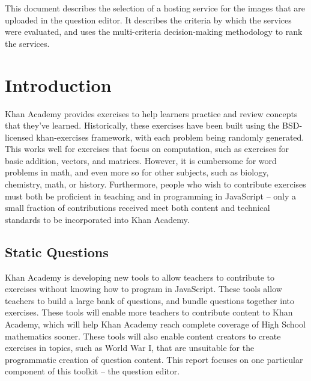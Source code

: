 \documentclass[se]{uw-wkrpt}
\begin{document}
This document describes the selection of a hosting service for the images that 
are uploaded in the question editor. It describes the criteria by which the 
services were evaluated, and uses the multi-criteria decision-making 
methodology to rank the services.

\tableofcontents
\listoffigures
\listoftables

\mainmatter

\section{Introduction}\label{sec:intro}
Khan Academy provides exercises to help learners practice and review concepts 
that they've learned. Historically, these exercises have been built using the 
BSD-licensed khan-exercises framework, with each problem being randomly 
generated. This works well for exercises that focus on computation, such as 
exercises for basic addition, vectors, and matrices. However, it is cumbersome 
for word problems in math, and even more so for other subjects, such as 
biology, chemistry, math, or history. Furthermore, people who wish to 
contribute exercises must both be proficient in teaching and in programming in 
JavaScript -- only a small fraction of contributions received meet both content 
and technical standards to be incorporated into Khan Academy.

\subsection{Static Questions}\label{sec:staticq}
Khan Academy is developing new tools to allow teachers to contribute to 
exercises without knowing how to program in JavaScript. These tools allow 
teachers to build a large bank of questions, and bundle questions together into 
exercises. These tools will enable more teachers to contribute content to Khan 
Academy, which will help Khan Academy reach complete coverage of High School 
mathematics sooner. These tools will also enable content creators to create 
exercises in topics, such as World War I, that are unsuitable for the 
programmatic creation of question content. This report focuses on one 
particular component of this toolkit -- the question editor.
\end{document}
